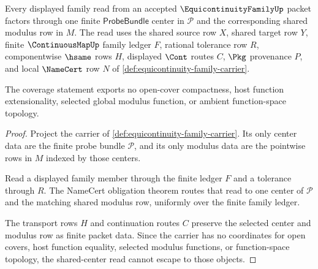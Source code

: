 \begin{theorem}
\label{thm:equicontinuity-family-shared-center-coverage}
Every displayed family read from an accepted $\EquicontinuityFamilyUp$ packet factors through one finite $\mathsf{ProbeBundle}$ center in $\mathcal{P}$ and the corresponding shared modulus row in $M$. The read uses the shared source row $X$, shared target row $Y$, finite $\ContinuousMapUp$ family ledger $F$, rational tolerance row $R$, componentwise $\hsame$ rows $H$, displayed $\Cont$ routes $C$, $\Pkg$ provenance $P$, and local $\NameCert$ row $N$ of \autoref{def:equicontinuity-family-carrier}.

The coverage statement exports no open-cover compactness, host function extensionality, selected global modulus function, or ambient function-space topology.
\end{theorem}
\begin{proof}
Project the carrier of \autoref{def:equicontinuity-family-carrier}. Its only center data are the finite probe bundle $\mathcal{P}$, and its only modulus data are the pointwise rows in $M$ indexed by those centers.

Read a displayed family member through the finite ledger $F$ and a tolerance through $R$. The NameCert obligation theorem routes that read to one center of $\mathcal{P}$ and the matching shared modulus row, uniformly over the finite family ledger.

The transport rows $H$ and continuation routes $C$ preserve the selected center and modulus row as finite packet data. Since the carrier has no coordinates for open covers, host function equality, selected modulus functions, or function-space topology, the shared-center read cannot escape to those objects.
\end{proof}


